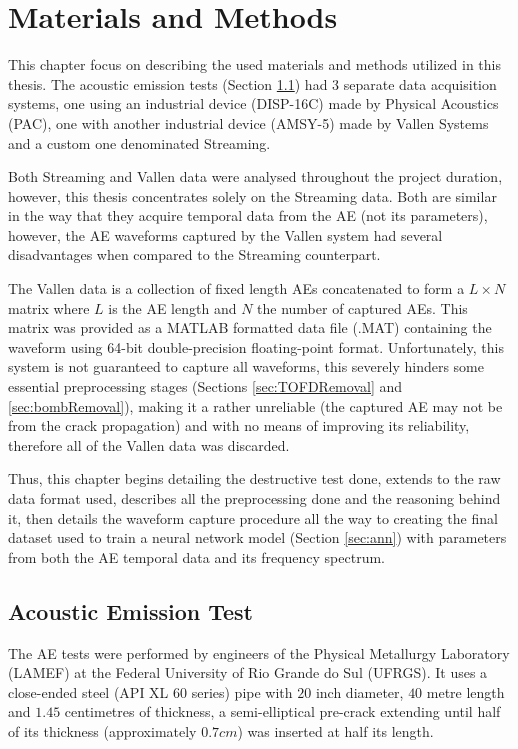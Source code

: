 \chapter{Materials and Methods}

This chapter focus on describing the used materials and methods utilized in this thesis. The acoustic emission tests (Section \ref{sec:AETest}) had 3 separate data acquisition systems, one using an industrial device (DISP-16C) made by Physical Acoustics (PAC), one with another industrial device (AMSY-5) made by Vallen Systems and a custom one denominated Streaming.

Both Streaming and Vallen data were analysed throughout the project duration, however, this thesis concentrates solely on the Streaming data. Both are similar in the way that they acquire temporal data from the AE (not its parameters), however, the AE waveforms captured by the Vallen system had several disadvantages when compared to the Streaming counterpart.

The Vallen data is a collection of fixed length AEs concatenated to form a $L \times N$ matrix where $L$ is the AE length and $N$ the number of captured AEs. This matrix was provided as a MATLAB formatted data file (.MAT) containing the waveform using 64-bit double-precision floating-point format. Unfortunately, this system is not guaranteed to capture all waveforms, this severely hinders some essential preprocessing stages (Sections \ref{sec:TOFDRemoval} and \ref{sec:bombRemoval}), making it a rather unreliable (the captured AE may not be from the crack propagation) and with no means of improving its reliability, therefore all of the Vallen data was discarded.

Thus, this chapter begins detailing the destructive test done, extends to the raw data format used, describes all the preprocessing done and the reasoning behind it, then details the waveform capture procedure all the way to creating the final dataset used to train a neural network model (Section \ref{sec:ann}) with parameters from both the AE temporal data and its frequency spectrum.


\section{Acoustic Emission Test} \label{sec:AETest}

The AE tests were performed by engineers of the Physical Metallurgy Laboratory (LAMEF) at the Federal University of Rio Grande do Sul (UFRGS). It uses a close-ended steel (API XL 60 series) pipe with $20$ inch diameter, $40$ metre length and $1.45$ centimetres of thickness, a semi-elliptical pre-crack extending until half of its thickness (approximately $0.7 cm$) was inserted at half its length.


